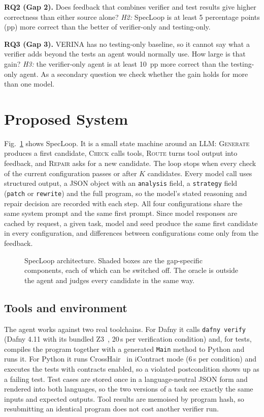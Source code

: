 \textbf{RQ2 (Gap 2).} Does feedback that combines verifier and test results give higher correctness than either source alone? \emph{H2:} SpecLoop is at least 5 percentage points (pp) more correct than the better of verifier-only and testing-only.

\textbf{RQ3 (Gap 3).} VERINA has no testing-only baseline, so it cannot say what a verifier adds beyond the tests an agent would normally use. How large is that gain? \emph{H3:} the verifier-only agent is at least 10~pp more correct than the testing-only agent. As a secondary question we check whether the gain holds for more than one model.

\section{Proposed System}
\label{sec:system}

Fig.~\ref{fig:arch} shows SpecLoop. It is a small state machine around an LLM: \textsc{Generate} produces a first candidate, \textsc{Check} calls tools, \textsc{Route} turns tool output into feedback, and \textsc{Repair} asks for a new candidate. The loop stops when every check of the current configuration passes or after $K$ candidates. Every model call uses structured output, a JSON object with an \texttt{analysis} field, a \texttt{strategy} field (\texttt{patch} or \texttt{rewrite}) and the full program, so the model's stated reasoning and repair decision are recorded with each step. All four configurations share the same system prompt and the same first prompt. Since model responses are cached by request, a given task, model and seed produce the same first candidate in every configuration, and differences between configurations come only from the feedback.

\begin{figure}[t]
\centering
\resizebox{\columnwidth}{!}{}
\caption{SpecLoop architecture. Shaded boxes are the gap-specific components, each of which can be switched off. The oracle is outside the agent and judges every candidate in the same way.}
\label{fig:arch}
\end{figure}

\subsection{Tools and environment}
The agent works against two real toolchains. For Dafny it calls \texttt{dafny verify} (Dafny 4.11 with its bundled Z3~\cite{demoura2008z3}, 20\,s per verification condition) and, for tests, compiles the program together with a generated \texttt{Main} method to Python and runs it. For Python it runs CrossHair~\cite{crosshair} in iContract mode (6\,s per condition) and executes the tests with contracts enabled, so a violated postcondition shows up as a failing test. Test cases are stored once in a language-neutral JSON form and rendered into both languages, so the two versions of a task see exactly the same inputs and expected outputs. Tool results are memoised by program hash, so resubmitting an identical program does not cost another verifier run.

